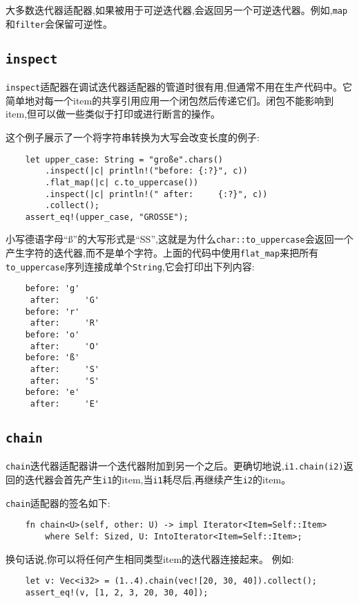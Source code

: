 大多数迭代器适配器,如果被用于可逆迭代器,会返回另一个可逆迭代器。例如,\texttt{map}和\texttt{filter}会保留可逆性。

\subsection{\texttt{inspect}}
\texttt{inspect}适配器在调试迭代器适配器的管道时很有用,但通常不用在生产代码中。它简单地对每一个item的共享引用应用一个闭包然后传递它们。闭包不能影响到item,但可以做一些类似于打印或进行断言的操作。

这个例子展示了一个将字符串转换为大写会改变长度的例子:
\begin{verbatim}
    let upper_case: String = "große".chars()
        .inspect(|c| println!("before: {:?}", c))
        .flat_map(|c| c.to_uppercase())
        .inspect(|c| println!(" after:     {:?}", c))
        .collect();
    assert_eq!(upper_case, "GROSSE");
\end{verbatim}

小写德语字母“ß”的大写形式是“SS”,这就是为什么\texttt{char::to\_uppercase}会返回一个产生字符的迭代器,而不是单个字符。上面的代码中使用\texttt{flat\_map}来把所有\texttt{to\_uppercase}序列连接成单个\texttt{String},它会打印出下列内容:
\begin{verbatim}
    before: 'g'
     after:     'G'
    before: 'r'
     after:     'R'
    before: 'o'
     after:     'O'
    before: 'ß'
     after:     'S'
     after:     'S'
    before: 'e'
     after:     'E'
\end{verbatim}

\subsection{\texttt{chain}}
\texttt{chain}迭代器适配器讲一个迭代器附加到另一个之后。更确切地说,\texttt{i1.chain(i2)}返回的迭代器会首先产生\texttt{i1}的item,当\texttt{i1}耗尽后,再继续产生\texttt{i2}的item。

\texttt{chain}适配器的签名如下:
\begin{verbatim}
    fn chain<U>(self, other: U) -> impl Iterator<Item=Self::Item>
        where Self: Sized, U: IntoIterator<Item=Self::Item>;
\end{verbatim}

换句话说,你可以将任何产生相同类型item的迭代器连接起来。
例如:
\begin{verbatim}
    let v: Vec<i32> = (1..4).chain(vec![20, 30, 40]).collect();
    assert_eq!(v, [1, 2, 3, 20, 30, 40]);
\end{verbatim}

